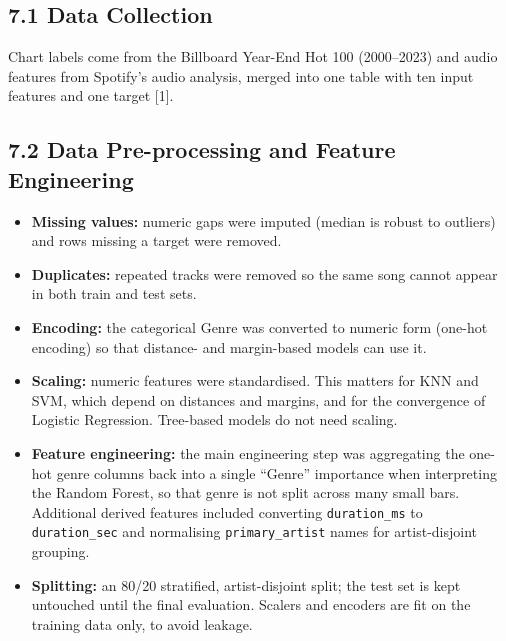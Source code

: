 \documentclass[11pt,a4paper]{article}
\begin{document}
\subsection*{7.1 Data Collection}
Chart labels come from the Billboard Year-End Hot 100 (2000--2023) and audio features from Spotify's audio analysis, merged into one table with ten input features and one target [1].

\subsection*{7.2 Data Pre-processing and Feature Engineering}
\begin{itemize}
  \item \textbf{Missing values:} numeric gaps were imputed (median is robust to outliers) and rows missing a target were removed.
  \item \textbf{Duplicates:} repeated tracks were removed so the same song cannot appear in both train and test sets.
  \item \textbf{Encoding:} the categorical Genre was converted to numeric form (one-hot encoding) so that distance- and margin-based models can use it.
  \item \textbf{Scaling:} numeric features were standardised. This matters for KNN and SVM, which depend on distances and margins, and for the convergence of Logistic Regression. Tree-based models do not need scaling.
  \item \textbf{Feature engineering:} the main engineering step was aggregating the one-hot genre columns back into a single ``Genre'' importance when interpreting the Random Forest, so that genre is not split across many small bars. Additional derived features included converting \texttt{duration\_ms} to \texttt{duration\_sec} and normalising \texttt{primary\_artist} names for artist-disjoint grouping.
  \item \textbf{Splitting:} an 80/20 stratified, artist-disjoint split; the test set is kept untouched until the final evaluation. Scalers and encoders are fit on the training data only, to avoid leakage.
\end{itemize}
\end{document}
